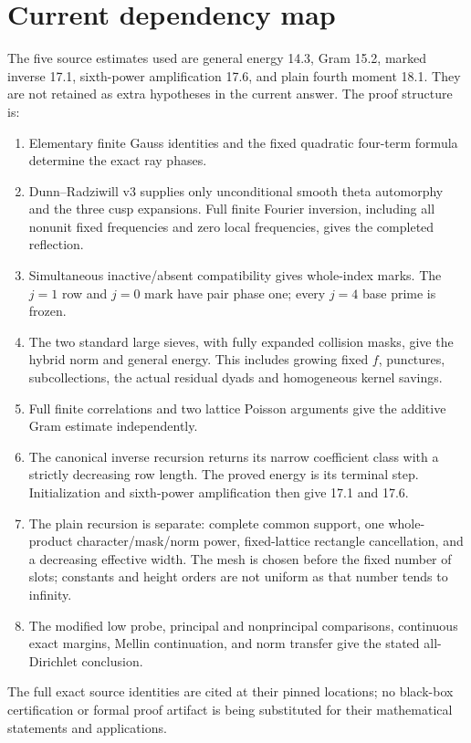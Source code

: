 \documentclass[12pt]{article}
\begin{document}
\section{Current dependency map}
The five source estimates used are general energy 14.3, Gram 15.2,
marked inverse 17.1, sixth-power amplification 17.6, and plain
fourth moment 18.1.  They are not retained as extra hypotheses
in the current answer.  The proof structure is:
\begin{enumerate}
\item Elementary finite Gauss identities and the fixed
quadratic four-term formula determine the exact ray phases.
\item Dunn--Radziwill v3 supplies only unconditional smooth theta
automorphy and the three cusp expansions.  Full finite Fourier
inversion, including all nonunit fixed frequencies and zero local
frequencies, gives the completed reflection.
\item Simultaneous inactive/absent compatibility gives whole-index
marks.  The \(j=1\) row and \(j=0\) mark have pair phase one;
every \(j=4\) base prime is frozen.
\item The two standard large sieves, with fully expanded
collision masks, give the hybrid norm and general energy.
This includes growing fixed \(f\), punctures, subcollections,
the actual residual dyads and homogeneous kernel savings.
\item Full finite correlations and two lattice Poisson arguments
give the additive Gram estimate independently.
\item The canonical inverse recursion returns its narrow
coefficient class with a strictly decreasing row length.
The proved energy is its terminal step.  Initialization and
sixth-power amplification then give 17.1 and 17.6.
\item The plain recursion is separate: complete common support,
one whole-product character/mask/norm power, fixed-lattice
rectangle cancellation, and a decreasing effective width.
The mesh is chosen before the fixed number of slots; constants
and height orders are not uniform as that number tends to infinity.
\item The modified low probe, principal and nonprincipal comparisons,
continuous exact margins, Mellin continuation, and norm transfer
give the stated all-Dirichlet conclusion.
\end{enumerate}
The full exact source identities are cited at their pinned
locations; no black-box certification or formal proof artifact
is being substituted for their mathematical statements and
applications.
\end{document}
